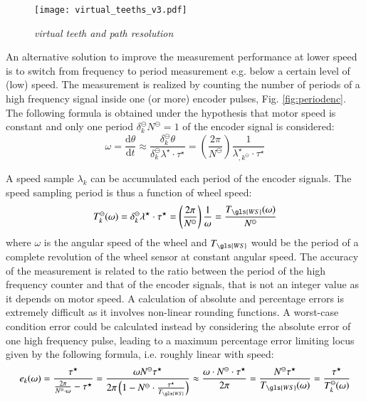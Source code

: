 \begin{figure}[ht!]
\centerline{
\texttt{[image: virtual\_teeths\_v3.pdf]}
}
\caption{\emph{virtual teeth and path resolution}}
\label {fig:virtualteeth}
\end{figure}
An alternative solution to improve the measurement performance at lower speed is to switch from frequency to period measurement e.g. below a certain level of (low) speed. The measurement is realized by counting the number of periods of a high frequency signal inside one (or more) encoder pulses, Fig. \ref{fig:periodenc}. The following formula is obtained under the hypothesis that motor speed is constant and only one period $\delta^\ominus_k N^\ominus = 1$ of the encoder signal is considered:
\begin{equation}
\omega=\frac{\mathrm{d}\theta}{\mathrm{d}t}\approx \frac{\delta^\ominus_k\theta}{\delta^\ominus_k\lambda^\star\cdot\tau^\star}= \left(\frac{2\pi}{N^\ominus}\right)\frac{1}{\lambda^\star_{,k^\ominus}\cdot\tau^\star}
\end{equation}

A speed sample $\lambda_k$ can be accumulated each period of the encoder signals. The speed sampling period is thus a function of wheel speed:
\begin{equation}
T^\ominus_k(\omega) =\delta^\ominus_k\lambda^\star\cdot\tau^\star = \left( \frac{2\pi}{N^\ominus}\right)  \frac{1}{\omega}=\frac{T_{\gls{WS}}(\omega)}{N^\ominus}
\end{equation}
where $\omega$ is the angular speed of the wheel and $T_{\gls{WS}}$ would be the period of a complete revolution of the wheel sensor at constant angular speed.
The accuracy of the measurement is related to the ratio between the period of the high frequency counter and that of the encoder signals, that is not an integer value as it depends on motor speed. A calculation of absolute and percentage errors is extremely difficult as it involves non-linear rounding functions.
A worst-case condition error could be calculated instead by considering the absolute error of one high frequency pulse, leading to a maximum percentage error limiting locus given by the following formula, i.e. roughly linear with speed:
\begin{equation}
e_k(\omega)=\frac{\tau^\star}{\frac{2\pi}{N^\otimes\cdot\omega}-\tau^\star} = \frac{\omega N^\ominus \tau^\star}{2\pi \left(1-N^\ominus\cdot\frac{\tau^\star}{T_{\gls{WS}}}\right)} \approx \frac{\omega\cdot N^\ominus\cdot \tau^\star}{2\pi}=\frac{N^\ominus\tau^\star}{T_{\gls{WS}}(\omega)} = \frac{\tau^\star}{T^\ominus_k(\omega)}
\end{equation}

